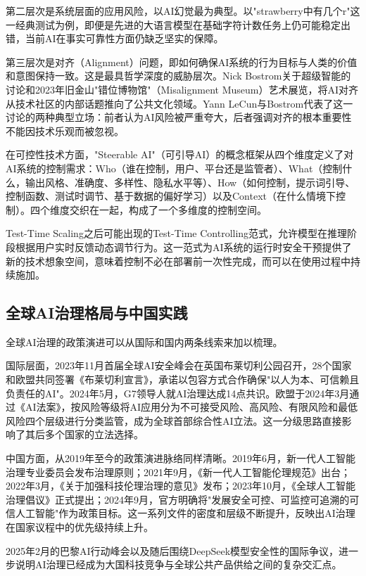 \documentclass[12pt,a4paper]{ctexart}
\begin{document}
第二层次是系统层面的应用风险，以AI幻觉最为典型。以"strawberry中有几个r"这一经典测试为例，即便是先进的大语言模型在基础字符计数任务上仍可能稳定出错，当前AI在事实可靠性方面仍缺乏坚实的保障。

第三层次是对齐（Alignment）问题，即如何确保AI系统的行为目标与人类的价值和意图保持一致。这是最具哲学深度的威胁层次。Nick Bostrom关于超级智能的讨论和2023年旧金山"错位博物馆"（Misalignment Museum）艺术展览，将AI对齐从技术社区的内部话题推向了公共文化领域。Yann LeCun与Bostrom代表了这一讨论的两种典型立场：前者认为AI风险被严重夸大，后者强调对齐的根本重要性不能因技术乐观而被忽视。

在可控性技术方面，"Steerable AI"（可引导AI）的概念框架从四个维度定义了对AI系统的控制需求：Who（谁在控制，用户、平台还是监管者）、What（控制什么，输出风格、准确度、多样性、隐私水平等）、How（如何控制，提示词引导、控制函数、测试时调节、基于数据的偏好学习）以及Context（在什么情境下控制）。四个维度交织在一起，构成了一个多维度的控制空间。

Test-Time Scaling之后可能出现的Test-Time Controlling范式，允许模型在推理阶段根据用户实时反馈动态调节行为。这一范式为AI系统的运行时安全干预提供了新的技术想象空间，意味着控制不必在部署前一次性完成，而可以在使用过程中持续施加。

\subsection{全球AI治理格局与中国实践}

全球AI治理的政策演进可以从国际和国内两条线索来加以梳理。

国际层面，2023年11月首届全球AI安全峰会在英国布莱切利公园召开，28个国家和欧盟共同签署《布莱切利宣言》，承诺以包容方式合作确保"以人为本、可信赖且负责任的AI"。2024年5月，G7领导人就AI治理达成14点共识。欧盟于2024年3月通过《AI法案》，按风险等级将AI应用分为不可接受风险、高风险、有限风险和最低风险四个层级进行分类监管，成为全球首部综合性AI立法。这一分级思路直接影响了其后多个国家的立法选择。

中国方面，从2019年至今的政策演进脉络同样清晰。2019年6月，新一代人工智能治理专业委员会发布治理原则；2021年9月，《新一代人工智能伦理规范》出台；2022年3月，《关于加强科技伦理治理的意见》发布；2023年10月，《全球人工智能治理倡议》正式提出；2024年9月，官方明确将"发展安全可控、可监控可追溯的可信人工智能"作为政策目标。这一系列文件的密度和层级不断提升，反映出AI治理在国家议程中的优先级持续上升。

2025年2月的巴黎AI行动峰会以及随后围绕DeepSeek模型安全性的国际争议，进一步说明AI治理已经成为大国科技竞争与全球公共产品供给之间的复杂交汇点。
\end{document}
